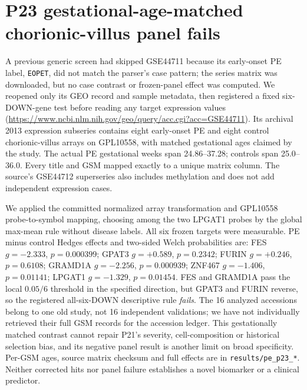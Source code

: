\documentclass[11pt,a4paper]{article}
\begin{document}
\section{P23 gestational-age-matched chorionic-villus panel fails}
A previous generic screen had skipped GSE44711 because its early-onset PE label, \texttt{EOPET}, did not match the parser's case pattern; the series matrix was downloaded, but no case contrast or frozen-panel effect was computed. We reopened only its GEO record and sample metadata, then registered a fixed six-DOWN-gene test before reading any target expression values (\url{https://www.ncbi.nlm.nih.gov/geo/query/acc.cgi?acc=GSE44711}). Its archival 2013 expression subseries contains eight early-onset PE and eight control chorionic-villus arrays on GPL10558, with matched gestational ages claimed by the study. The actual PE gestational weeks span 24.86--37.28; controls span 25.0--36.0. Every title and GSM mapped exactly to a unique matrix column. The source's GSE44712 superseries also includes methylation and does not add independent expression cases.

We applied the committed normalized array transformation and GPL10558 probe-to-symbol mapping, choosing among the two LPGAT1 probes by the global max-mean rule without disease labels. All six frozen targets were measurable. PE minus control Hedges effects and two-sided Welch probabilities are: FES $g=-2.333$, $p=0.000399$; GPAT3 $g=+0.589$, $p=0.2342$; FURIN $g=+0.246$, $p=0.6108$; GRAMD1A $g=-2.256$, $p=0.000939$; ZNF467 $g=-1.406$, $p=0.01141$; LPGAT1 $g=-1.329$, $p=0.01454$. FES and GRAMD1A pass the local $0.05/6$ threshold in the specified direction, but GPAT3 and FURIN reverse, so the registered all-six-DOWN descriptive rule \emph{fails}. The 16 analyzed accessions belong to one old study, not 16 independent validations; we have not individually retrieved their full GSM records for the accession ledger. This gestationally matched contrast cannot repair P21's severity, cell-composition or historical selection bias, and its negative panel result is another limit on broad specificity. Per-GSM ages, source matrix checksum and full effects are in \texttt{results/pe\_p23\_*}. Neither corrected hits nor panel failure establishes a novel biomarker or a clinical predictor.
\end{document}
